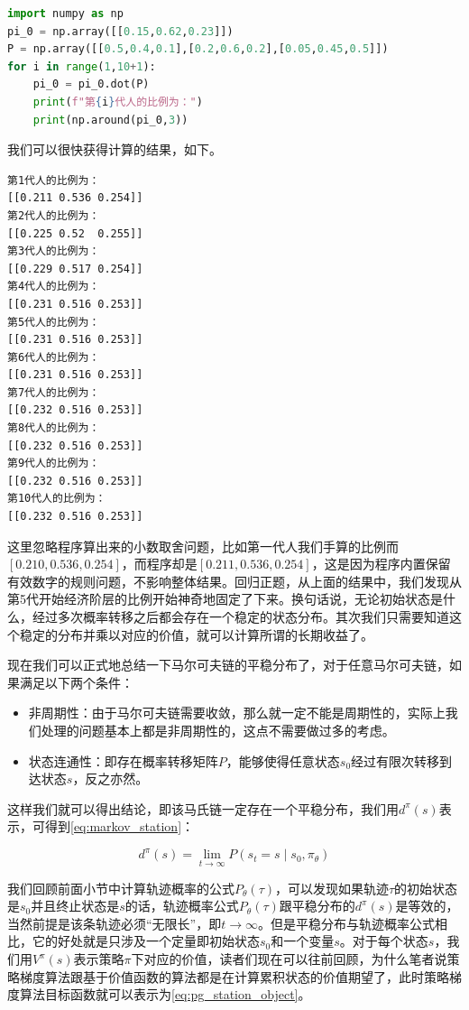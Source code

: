 \begin{lstlisting}[language=Python]
import numpy as np
pi_0 = np.array([[0.15,0.62,0.23]])
P = np.array([[0.5,0.4,0.1],[0.2,0.6,0.2],[0.05,0.45,0.5]])
for i in range(1,10+1):
    pi_0 = pi_0.dot(P)
    print(f"第{i}代人的比例为：")
    print(np.around(pi_0,3))
\end{lstlisting}

我们可以很快获得计算的结果，如下。

\begin{lstlisting}[language=Bash]
第1代人的比例为：
[[0.211 0.536 0.254]]
第2代人的比例为：
[[0.225 0.52  0.255]]
第3代人的比例为：
[[0.229 0.517 0.254]]
第4代人的比例为：
[[0.231 0.516 0.253]]
第5代人的比例为：
[[0.231 0.516 0.253]]
第6代人的比例为：
[[0.231 0.516 0.253]]
第7代人的比例为：
[[0.232 0.516 0.253]]
第8代人的比例为：
[[0.232 0.516 0.253]]
第9代人的比例为：
[[0.232 0.516 0.253]]
第10代人的比例为：
[[0.232 0.516 0.253]]
\end{lstlisting}

这里忽略程序算出来的小数取舍问题，比如第一代人我们手算的比例而$[0.210,0.536,0.254]$，而程序却是$[0.211,0.536,0.254]$，这是因为程序内置保留有效数字的规则问题，不影响整体结果。回归正题，从上面的结果中，我们发现从第5代开始经济阶层的比例开始神奇地固定了下来。换句话说，无论初始状态是什么，经过多次概率转移之后都会存在一个稳定的状态分布。其次我们只需要知道这个稳定的分布并乘以对应的价值，就可以计算所谓的长期收益了。

现在我们可以正式地总结一下马尔可夫链的平稳分布了，对于任意马尔可夫链，如果满足以下两个条件：

\begin{itemize}
    \item 非周期性：由于马尔可夫链需要收敛，那么就一定不能是周期性的，实际上我们处理的问题基本上都是非周期性的，这点不需要做过多的考虑。
    \item 状态连通性：即存在概率转移矩阵$P$，能够使得任意状态$s_0$经过有限次转移到达状态$s$，反之亦然。
\end{itemize}

这样我们就可以得出结论，即该马氏链一定存在一个平稳分布，我们用$d^{\pi}(s)$表示，可得到\eqref{eq:markov_station}：

\begin{equation}
    \label{eq:markov_station}
    d^\pi(s)=\lim _{t \rightarrow \infty} P\left(s_t=s \mid s_0, \pi_\theta\right)
\end{equation}

我们回顾前面小节中计算轨迹概率的公式$P_{\theta}(\tau)$，可以发现如果轨迹$\tau$的初始状态是$s_0$并且终止状态是$s$的话，轨迹概率公式$P_{\theta}(\tau)$跟平稳分布的$d^\pi(s)$是等效的，当然前提是该条轨迹必须“无限长”，即$t \rightarrow \infty$。但是平稳分布与轨迹概率公式相比，它的好处就是只涉及一个定量即初始状态$s_0$和一个变量$s$。对于每个状态$s$，我们用$V^{\pi}(s)$表示策略$\pi$下对应的价值，读者们现在可以往前回顾，为什么笔者说策略梯度算法跟基于价值函数的算法都是在计算累积状态的价值期望了，此时策略梯度算法目标函数就可以表示为\eqref{eq:pg_station_object}。


